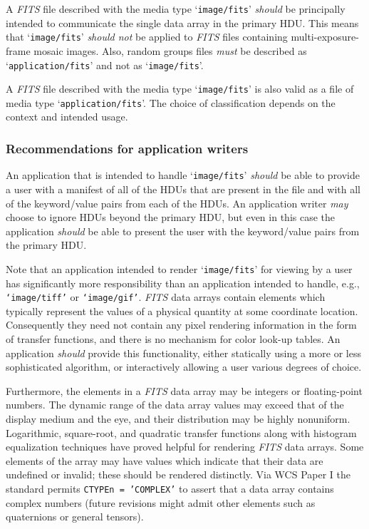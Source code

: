 \documentclass[onecolumn]{aa}
\begin{document}
  A {\em FITS\/} file described with the media type `{\tt image/fits}' {\em should} be
  principally intended to communicate the single data array in the
  primary HDU.  This means that `{\tt image/fits}' {\em should not} be applied to {\em FITS\/}   
  files containing multi-exposure-frame mosaic images.  Also,
  random groups files {\em must} be described as `{\tt application/fits}' and not
  as `{\tt image/fits}'.


  A {\em FITS\/} file described with the media type `{\tt image/fits}' is also valid
  as a file of media type `{\tt application/fits}'.  The choice of
  classification depends on the context and intended usage.

\subsubsection{Recommendations for application writers}

  An application that is intended to handle `{\tt image/fits}' {\em should} be able
  to provide a user with a manifest of all of the HDUs that are present
  in the file and with all of the keyword/value pairs from each of the
  HDUs.  An application writer {\em may} choose to ignore HDUs beyond the
  primary HDU, but even in this case the application {\em should} be able to present
  the user with the keyword/value pairs from the primary HDU.

  Note that an application intended to render `{\tt image/fits}' for viewing
  by a user has significantly more responsibility than an application
  intended to handle, e.g., {\tt `image/tiff'} or {\tt `image/gif'}.  {\em FITS\/} data
  arrays contain elements which typically represent the values of a
  physical quantity at some coordinate location.  Consequently they
  need not contain any pixel rendering information in the form of
  transfer functions, and there is no mechanism for color look-up
  tables.  An application {\em should} provide this functionality, either
  statically using a more or less sophisticated algorithm, or
  interactively allowing a user various degrees of choice.

  Furthermore, the elements in a {\em FITS\/} data array may be integers or
  floating-point numbers.  The dynamic range of the data array values
  may exceed that of the display medium and the eye, and their
  distribution may be highly nonuniform.  Logarithmic, square-root, and
  quadratic transfer functions along with histogram equalization
  techniques have proved helpful for rendering {\em FITS\/} data arrays.  Some
  elements of the array may have values which indicate that their data
  are undefined or invalid; these should be rendered distinctly.  Via
  WCS Paper I \citep{greisen02} the standard permits {\tt CTYPEn = 'COMPLEX'} to
  assert that a data array contains complex numbers (future revisions
  might admit other elements such as quaternions or general tensors).
\end{document}
